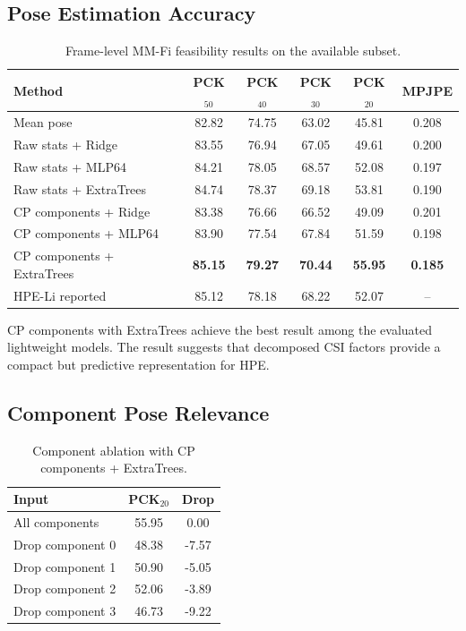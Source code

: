 \subsection{Pose Estimation Accuracy}

\begin{table}[t]
\centering
\caption{Frame-level MM-Fi feasibility results on the available subset.}
\begin{tabular}{lccccc}
\toprule
Method & PCK$_{50}$ & PCK$_{40}$ & PCK$_{30}$ & PCK$_{20}$ & MPJPE \\
\midrule
Mean pose & 82.82 & 74.75 & 63.02 & 45.81 & 0.208 \\
Raw stats + Ridge & 83.55 & 76.94 & 67.05 & 49.61 & 0.200 \\
Raw stats + MLP64 & 84.21 & 78.05 & 68.57 & 52.08 & 0.197 \\
Raw stats + ExtraTrees & 84.74 & 78.37 & 69.18 & 53.81 & 0.190 \\
CP components + Ridge & 83.38 & 76.66 & 66.52 & 49.09 & 0.201 \\
CP components + MLP64 & 83.90 & 77.54 & 67.84 & 51.59 & 0.198 \\
CP components + ExtraTrees & \textbf{85.15} & \textbf{79.27} & \textbf{70.44} & \textbf{55.95} & \textbf{0.185} \\
HPE-Li reported & 85.12 & 78.18 & 68.22 & 52.07 & -- \\
\bottomrule
\end{tabular}
\end{table}

CP components with ExtraTrees achieve the best result among the evaluated lightweight models. The result suggests that decomposed CSI factors provide a compact but predictive representation for HPE.

\subsection{Component Pose Relevance}

\begin{table}[t]
\centering
\caption{Component ablation with CP components + ExtraTrees.}
\begin{tabular}{lcc}
\toprule
Input & PCK$_{20}$ & Drop \\
\midrule
All components & 55.95 & 0.00 \\
Drop component 0 & 48.38 & -7.57 \\
Drop component 1 & 50.90 & -5.05 \\
Drop component 2 & 52.06 & -3.89 \\
Drop component 3 & 46.73 & -9.22 \\
\bottomrule
\end{tabular}
\end{table}

